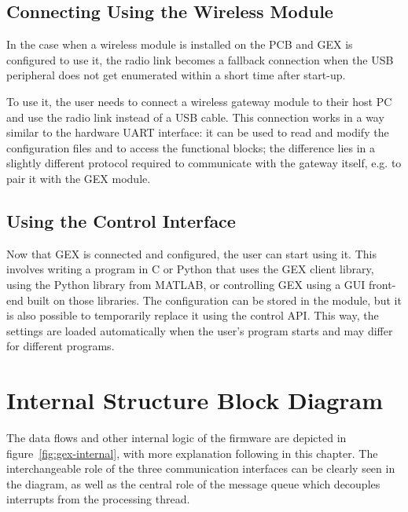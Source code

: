 \subsection{Connecting Using the Wireless Module}

In the case when a wireless module is installed on the \gls{PCB} and GEX is configured to use it, the radio link becomes a fallback connection when the \gls{USB} peripheral does not get enumerated within a short time after start-up.

To use it, the user needs to connect a wireless gateway module to their host \gls{PC} and use the radio link instead of a \gls{USB} cable. This connection works in a way similar to the hardware UART interface: it can be used to read and modify the configuration files and to access the functional blocks; the difference lies in a slightly different protocol required to communicate with the gateway itself, e.g. to pair it with the GEX module.

\subsection{Using the Control Interface}

Now that GEX is connected and configured, the user can start using it. This involves writing a program in C or Python that uses the GEX client library, using the Python library from MATLAB, or controlling GEX using a \gls{GUI} front-end built on those libraries. The configuration can be stored in the module, but it is also possible to temporarily replace it using the control \gls{API}. This way, the settings are loaded automatically when the user's program starts and may differ for different programs.

\section{Internal Structure Block Diagram}

The data flows and other internal logic of the firmware are depicted in figure~\ref{fig:gex-internal}, with more explanation following in this chapter. The interchangeable role of the three communication interfaces can be clearly seen in the diagram, as well as the central role of the message queue which decouples interrupts from the processing thread.

